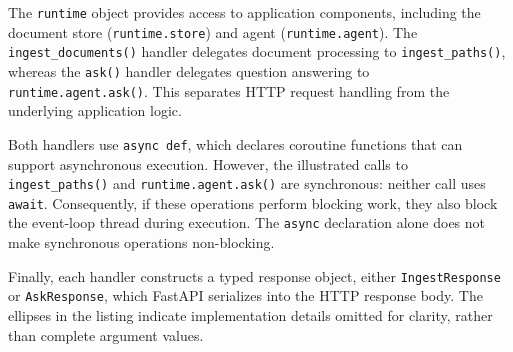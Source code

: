 The \texttt{runtime} object provides access to application
components, including the document store
(\texttt{runtime.store}) and agent
(\texttt{runtime.agent}). The \texttt{ingest\_documents()}
handler delegates document processing to
\texttt{ingest\_paths()}, whereas the \texttt{ask()}
handler delegates question answering to
\texttt{runtime.agent.ask()}. This separates HTTP request
handling from the underlying application logic.

Both handlers use \texttt{async def}, which declares
coroutine functions that can support asynchronous execution.
However, the illustrated calls to \texttt{ingest\_paths()}
and \texttt{runtime.agent.ask()} are synchronous: neither
call uses \texttt{await}. Consequently, if these operations
perform blocking work, they also block the event-loop thread
during execution. The \texttt{async} declaration alone does
not make synchronous operations non-blocking.

Finally, each handler constructs a typed response object,
either \texttt{IngestResponse} or \texttt{AskResponse},
which FastAPI serializes into the HTTP response body.
The ellipses in the listing indicate implementation details
omitted for clarity, rather than complete argument values.

